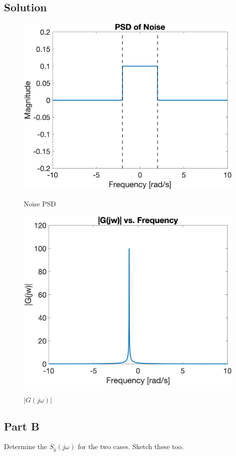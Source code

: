 \documentclass{article}
\begin{document}
\subsection*{Solution}
\begin{figure}[H]
    \centering
    \includegraphics[width=0.75\linewidth]{../figures/p5_noise_psd.png}\label{fig:p5_noise_psd}
    \caption{Noise PSD}
\end{figure}
\begin{figure}[H]
    \centering
    \includegraphics[width=0.75\linewidth]{../figures/p5_gjw.png}\label{fig:p5_gjw}
    \caption{$|G(j\omega)|$}
\end{figure}

\subsection*{Part B}
Determine the $S_y(j\omega)$ for the two cases.  Sketch these too.
\end{document}
